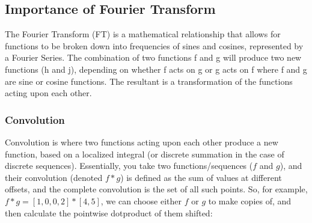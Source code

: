 \documentclass[a4paper,11pt]{article}
\theoremstyle{mytheor}
\begin{document}

\subsection{Importance of Fourier Transform}
\cite{Heat}\cite{FFTA}\cite{Probab}\cite{Harm}
The Fourier Transform (FT) is a mathematical relationship that allows for functions to be broken down into frequencies of sines and cosines, represented by a Fourier Series.  The combination of two functions f and g will produce two new functions (h and j), depending on whether f acts on g or g acts on f where f and g are sine or cosine functions.  The resultant is a transformation of the functions acting upon each other. 

\subsubsection{Convolution}
\cite{Asym}\cite{Qconvq}\cite{FFTA}
Convolution is where two functions acting upon each other produce a new function, based on a localized integral (or discrete summation in the case of discrete sequences). Essentially, you take two functions/sequences ($f$ and $g$), and their convolution (denoted $f * g$) is defined as the sum of values at different offsets, and the complete convolution is the set of all such points. So, for example, $f * g = [1, 0, 0, 2] * [4, 5] $, we can choose either $f$ or $g$ to make copies of, and then calculate the pointwise dotproduct of them shifted:
\end{document}
